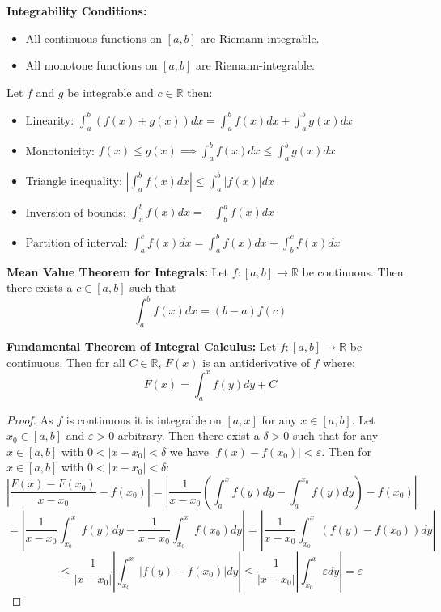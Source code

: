 \begin{theorem}
    \textbf{Integrability Conditions:}
    \begin{itemize}
        \item All continuous functions on $[a,b]$ are Riemann-integrable.
        \item All monotone functions on $[a,b]$ are Riemann-integrable.
    \end{itemize}   
\end{theorem}

\begin{theorem}
    Let $f$ and $g$ be integrable and $c \in \mathbb{R}$ then:
    \begin{itemize}
        \item Linearity: $\int_a^b (f(x) \pm g(x))dx = \int_a^b f(x)dx \pm \int_a^b g(x)dx$
        \item Monotonicity: $f(x) \leq g(x) \implies \int_a^b f(x)dx \leq \int_a^b g(x)dx$
        \item Triangle inequality: $\left| \int_a^b f(x)dx \right| \leq \int_a^b |f(x)|dx$
        \item Inversion of bounds: $\int_{a}^{b} f(x)dx = -\int_{b}^{a} f(x)dx$
        \item Partition of interval: $\int_{a}^{c} f(x)dx = \int_{a}^{b} f(x)dx + \int_{b}^{c} f(x)dx$
    \end{itemize}    
\end{theorem}

\begin{theorem}
    \textbf{Mean Value Theorem for Integrals:}
    Let $f: [a,b] \to \mathbb{R}$ be continuous. Then there exists a $c \in [a,b]$ such that
    $$\int_{a}^{b} f(x)dx = (b-a)f(c)$$
\end{theorem}

\begin{theorem}
    \textbf{Fundamental Theorem of Integral Calculus:}
    Let $f: [a,b] \to \mathbb{R}$ be continuous. 
    Then for all $C \in \mathbb{R}$, $F(x)$ is an antiderivative of $f$ where:
    $$F(x) = \int_{a}^{x} f(y)dy + C$$
\end{theorem}

\begin{proof}
    As $f$ is continuous it is integrable on $[a,x]$ for any $x \in [a,b]$.
    Let $x_0 \in [a,b]$ and $\varepsilon > 0$ arbitrary. Then there exist a $\delta > 0$ such that for any $x \in [a,b]$ with $0 < |x-x_0| < \delta$ we have $|f(x) - f(x_0)| < \varepsilon$. 
    Then for $x \in [a,b]$ with $0 < |x-x_0| < \delta$:
    $$\left| \frac{F(x)-F(x_0)}{x-x_0} - f(x_0) \right| = \left| \frac{1}{x-x_0} \left( \int_{a}^{x} f(y)dy -\int_{a}^{x_0} f(y)dy \right) - f(x_0) \right|$$
    $$= \left| \frac{1}{x-x_0} \int_{x_0}^{x} f(y)dy - \frac{1}{x-x_0} \int_{x_0}^{x} f(x_0) dy \right| = \left| \frac{1}{x-x_0} \int_{x_0}^{x} (f(y)-f(x_0)) dy \right|$$
    $$\leq \frac{1}{|x-x_0|} \left| \int_{x_0}^{x} |f(y)-f(x_0)| dy \right| \leq \frac{1}{|x-x_0|} \left| \int_{x_0}^{x} \varepsilon dy \right| = \varepsilon$$
\end{proof}

